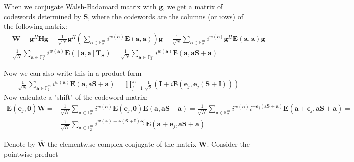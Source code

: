 \documentclass{article}
\begin{document}
	When we conjugate Walsh-Hadamard matrix with $\mathbf{g}$, we get a matrix of codewords determined by $\mathbf{S}$, where the codewords are the columns (or rows) of the following matrix:
	\begin{align*}
		&\mathbf{W} = \mathbf{g}^H\mathbf{H}\mathbf{g} = \frac{1}{\sqrt{N}}\mathbf{g}^H\left(\sum_{\mathbf{a} \in \mathbb{F}^m_2} i^{w(\mathbf{a})}\mathbf{E}(\mathbf{a},\mathbf{a})\right)\mathbf{g} = \frac{1}{\sqrt{N}}\sum_{\mathbf{a} \in \mathbb{F}^m_2} i^{w(\mathbf{a})}\mathbf{g}^H\mathbf{E}(\mathbf{a},\mathbf{a})\mathbf{g} = \\ &\frac{1}{\sqrt{N}}\sum_{\mathbf{a} \in \mathbb{F}^m_2} i^{w(\mathbf{a})}\mathbf{E}(\left[\mathbf{a},\mathbf{a}\right]\mathbf{T}_\mathbf{S}) = \frac{1}{\sqrt{N}}\sum_{\mathbf{a} \in \mathbb{F}^m_2} i^{w(\mathbf{a})}\mathbf{E}(\mathbf{a},\mathbf{a}\mathbf{S} + \mathbf{a})
	\end{align*}
	
	Now we can also write this in a product form
	\begin{align*}
		\frac{1}{\sqrt{N}} \sum_{\mathbf{a} \in \mathbb{F}^m_2} i^{w(\mathbf{a})}\mathbf{E}(\mathbf{a},\mathbf{a}\mathbf{S} + \mathbf{a}) = \prod_{j = 1}^m\frac{1}{\sqrt{2}}(\mathbf{I} + i\mathbf{E}(\mathbf{e}_j, \mathbf{e}_j(\mathbf{S} + \mathbf{I})))
	\end{align*}
	Now calculate a "shift" of the codeword matrix:
	\begin{align*}
		\mathbf{E}(\mathbf{e}_j, \mathbf{0})\mathbf{W} = &\frac{1}{\sqrt{N}} \sum_{\mathbf{a} \in \mathbb{F}^m_2} i^{w(\mathbf{a})}\mathbf{E}(\mathbf{e}_j,\mathbf{0})\mathbf{E}(\mathbf{a},\mathbf{a}\mathbf{S} + \mathbf{a}) = \frac{1}{\sqrt{N}} \sum_{\mathbf{a} \in \mathbb{F}^m_2} i^{w(\mathbf{a})}i^{-\mathbf{e}_j(\mathbf{a}\mathbf{S} + \mathbf{a})}\mathbf{E}(\mathbf{a} + \mathbf{e}_j,\mathbf{a}\mathbf{S} + \mathbf{a})  = \\ = &\frac{1}{\sqrt{N}} \sum_{\mathbf{a} \in \mathbb{F}^m_2} i^{w(\mathbf{a})-\mathbf{a}(\mathbf{S} + \mathbf{I})\mathbf{e}_j^T}\mathbf{E}(\mathbf{a} + \mathbf{e}_j,\mathbf{a}\mathbf{S} + \mathbf{a})
	\end{align*}
	
	\vspace{10mm}
	
	Denote by $\overline{\mathbf{W}}$ the elementwise complex conjugate of the matrix $\mathbf{W}$. Consider the pointwise product
	
\end{document}
